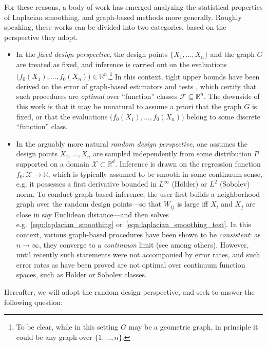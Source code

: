 \documentclass[twoside]{article}
\newcommand{\Reals}{\mathbb{R}}
\newcommand{\1}{\mathbf{1}}
\newcommand{\Rd}{\Reals^d}
\newcommand{\Xset}{\mathcal{X}}
\newcommand{\Leb}{L}
\newcommand{\mc}[1]{\mathcal{#1}}
\theoremstyle{definition}
\theoremstyle{remark}
\begin{document}
For these reasons, a body of work has emerged analyzing the statistical properties of Laplacian smoothing, and graph-based methods more generally. Roughly speaking, these works can be divided into two categories, based on the perspective they adopt. 
\begin{itemize}
	\item In the \emph{fixed design perspective}, the design points $\{X_1,\ldots,X_n\}$ and the graph $G$ are treated as fixed, and inference is carried out on the evaluations $\bigl(f_0(X_1),\ldots,f_0(X_n)\bigr) \in \Reals^n$.\footnote{To be clear, while in this setting $G$ may be a geometric graph, in principle it could be any graph over $\{1,\ldots,n\}$.} In this context, tight upper bounds have been derived on the error of graph-based estimators \citep{wang2016, sadhanala16,sadhanala17,kirichenko2017,kirichenko2018} and tests \citep{sharpnack2013,sharpnack2013b,sharpnack2015}, which certify that such procedures are \emph{optimal} over ``function'' classes $\mc{F} \subseteq \Reals^n$. The downside of this work is that it may be unnatural to assume a priori that the graph $G$ is fixed, or that the evaluations $\bigl(f_0(X_1),\ldots,f_0(X_n)\bigr)$ belong to some discrete ``function'' class.
	\item In the arguably more natural \emph{random design perspective},  one assumes the design points $X_1,\ldots,X_n$ are sampled independently from some distribution $P$ supported on a domain $\Xset \subset \Rd$. Inference is drawn on the regression function $f_0: \Xset \to \Reals$, which is typically assumed to be smooth in some continuum sense, e.g. it possesses a first derivative bounded in $L^{\infty}$ (H\"{o}lder) or $\Leb^2$ (Sobolev) norm. To conduct graph-based inference, the user first builds a neighborhood graph over the random design points---so that $W_{ij}$ is large iff $X_i$ and $X_j$ are close in say Euclidean distance---and then solves e.g.~\eqref{eqn:laplacian_smoothing} or~\eqref{eqn:laplacian_smoothing_test}. In this context, various graph-based procedures have been shown to be \emph{consistent}: as $n \to \infty$, they converge to a \emph{continuum} limit (see \citet{belkin07,trillos2018,vonluxburg2008} among others). However, until recently such statements were not accompanied by error rates, and such error rates as have been proved \citep{lee2016,trillos2020} are not optimal over continuum function spaces, such as H\"{o}lder or Sobolev classes. 
\end{itemize}
Hereafter, we will adopt the random design perspective, and seek to answer the following question:
\end{document}
